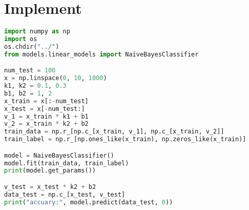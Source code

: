 \documentclass{report}
\begin{document}
\section{Implement}
\begin{lstlisting}[language={python}]
import numpy as np
import os
os.chdir("../")
from models.linear_models import NaiveBayesClassifier

num_test = 100
x = np.linspace(0, 10, 1000)
k1, k2 = 0.1, 0.3
b1, b2 = 1, 2
x_train = x[:-num_test]
x_test = x[-num_test:]
v_1 = x_train * k1 + b1
v_2 = x_train * k2 + b2
train_data = np.r_[np.c_[x_train, v_1], np.c_[x_train, v_2]]
train_label = np.r_[np.ones_like(x_train), np.zeros_like(x_train)]

model = NaiveBayesClassifier()
model.fit(train_data, train_label)
print(model.get_params())

v_test = x_test * k2 + b2
data_test = np.c_[x_test, v_test]
print("accuary:", model.predict(data_test, 0))
\end{lstlisting}
\end{document}
